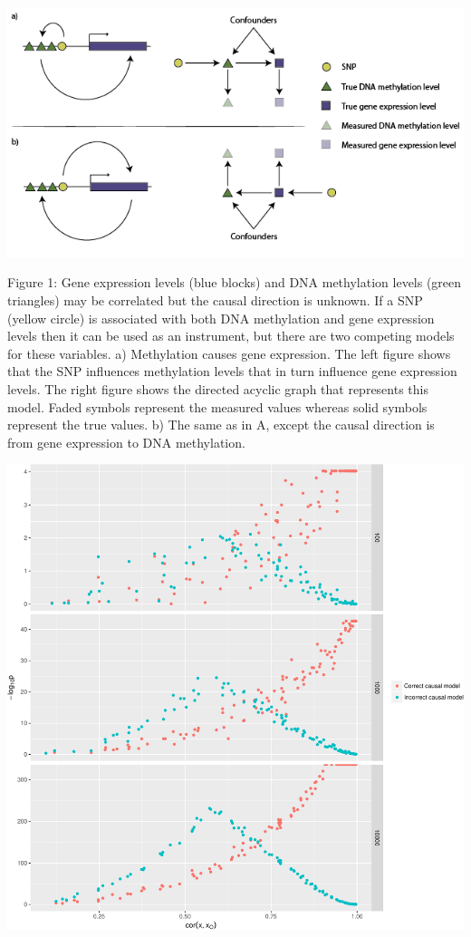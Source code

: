 \documentclass[]{article}
\begin{document}
\includegraphics{../images/dag-01.png}

Figure 1: Gene expression levels (blue blocks) and DNA methylation
levels (green triangles) may be correlated but the causal direction is
unknown. If a SNP (yellow circle) is associated with both DNA
methylation and gene expression levels then it can be used as an
instrument, but there are two competing models for these variables. a)
Methylation causes gene expression. The left figure shows that the SNP
influences methylation levels that in turn influence gene expression
levels. The right figure shows the directed acyclic graph that
represents this model. Faded symbols represent the measured values
whereas solid symbols represent the true values. b) The same as in A,
except the causal direction is from gene expression to DNA methylation.

\newpage

\includegraphics{manuscript_files/figure-latex/cit_measurement_error_figure-1.pdf}
\end{document}
